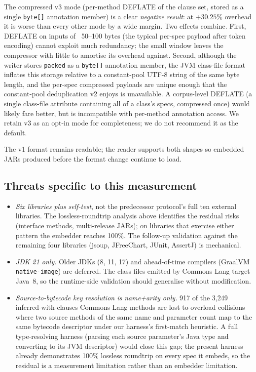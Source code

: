 The compressed v3 mode (per-method DEFLATE of the clause set, stored as a single \texttt{byte[]} annotation member) is a clear \emph{negative result}: at $+30.25\%$ overhead it is worse than every other mode by a wide margin. Two effects combine. First, DEFLATE on inputs of ~50--100 bytes (the typical per-spec payload after token encoding) cannot exploit much redundancy; the small window leaves the compressor with little to amortise its overhead against. Second, although the writer stores \texttt{packed} as a \texttt{byte[]} annotation member, the JVM class-file format inflates this storage relative to a constant-pool UTF-8 string of the same byte length, and the per-spec compressed payloads are unique enough that the constant-pool deduplication v2 enjoys is unavailable. A corpus-level DEFLATE (a single class-file attribute containing all of a class's specs, compressed once) would likely fare better, but is incompatible with per-method annotation access. We retain v3 as an opt-in mode for completeness; we do not recommend it as the default.

The v1 format remains readable; the reader supports both shapes so embedded JARs produced before the format change continue to load.

\subsection{Threats specific to this measurement}

\begin{itemize}
    \item \emph{Six libraries plus self-test}, not the predecessor protocol's full ten external libraries. The lossless-roundtrip analysis above identifies the residual risks (interface methods, multi-release JARs); on libraries that exercise either pattern the embedder reaches 100\%. The follow-up validation against the remaining four libraries (jsoup, JFreeChart, JUnit, AssertJ) is mechanical.
    \item \emph{JDK 21 only.} Older JDKs (8, 11, 17) and ahead-of-time compilers (GraalVM \texttt{native-image}) are deferred. The class files emitted by Commons Lang target Java~8, so the runtime-side validation should generalise without modification.
    \item \emph{Source-to-bytecode key resolution is name+arity only.} 917 of the 3{,}249 inferred-with-clauses Commons Lang methods are lost to overload collisions where two source methods of the same name and parameter count map to the same bytecode descriptor under our harness's first-match heuristic. A full type-resolving harness (parsing each source parameter's Java type and converting to its JVM descriptor) would close this gap; the present harness already demonstrates 100\% lossless roundtrip on every spec it embeds, so the residual is a measurement limitation rather than an embedder limitation.
\end{itemize}
